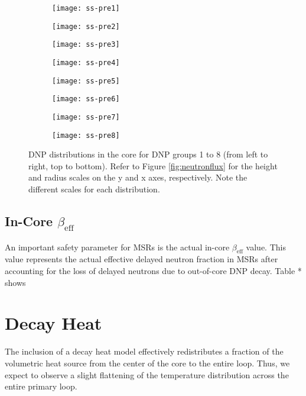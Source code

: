 \begin{figure}[htb!]
    \centering
    \begin{subfigure}[t]{.243\textwidth}
        \centering
        \texttt{[image: ss-pre1]}
    \end{subfigure}
    \begin{subfigure}[t]{.243\textwidth}
        \centering
        \texttt{[image: ss-pre2]}
    \end{subfigure}
    \begin{subfigure}[t]{.243\textwidth}
        \centering
        \texttt{[image: ss-pre3]}
    \end{subfigure}
    \begin{subfigure}[t]{.243\textwidth}
        \centering
        \texttt{[image: ss-pre4]}
    \end{subfigure}
    \begin{subfigure}[t]{.243\textwidth}
        \centering
        \texttt{[image: ss-pre5]}
    \end{subfigure}
    \begin{subfigure}[t]{.243\textwidth}
        \centering
        \texttt{[image: ss-pre6]}
    \end{subfigure}
    \begin{subfigure}[t]{.243\textwidth}
        \centering
        \texttt{[image: ss-pre7]}
    \end{subfigure}
    \begin{subfigure}[t]{.243\textwidth}
        \centering
        \texttt{[image: ss-pre8]}
    \end{subfigure}
    \caption{\gls{DNP} distributions in the core for \gls{DNP} groups
    1 to 8 (from left to right, top to bottom). Refer to Figure \ref{fig:neutronflux} for the height and radius
    scales on the y and x axes, respectively. Note the different scales for
    each distribution.}
    \label{fig:dnp}
\end{figure}

\subsection{In-Core \texorpdfstring{$\beta_{\text{eff}}$}{beta_eff}}

An important safety parameter for \glspl{MSR} is the actual in-core
$\beta_{\text{eff}}$ value. This value represents the actual effective delayed
neutron fraction in \glspl{MSR} after accounting for the loss of delayed
neutrons due to out-of-core \gls{DNP} decay. Table * shows 

\section{Decay Heat}

The inclusion of a decay heat model effectively redistributes a fraction of
the volumetric heat source from the center of the core to the entire loop.
Thus, we expect to observe a slight flattening of the temperature distribution
across the entire primary loop.
